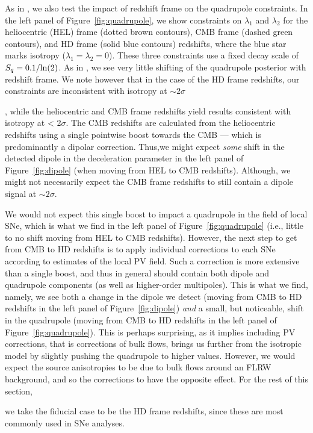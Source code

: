 \documentclass[fleqn,usenatbib]{mnras}
\newcommand{\jess}[1]{\textcolor{magenta} {\textbf{[JAC]:{#1}}}}
\begin{document}
As in , we also test the impact of redshift frame on the quadrupole constraints. %
{In the left panel of Figure~\ref{fig:quadrupole}, we show constraints on $\lambda_1$ and $\lambda_2$ for the heliocentric (HEL) frame (dotted brown contours), CMB frame (dashed green contours), and HD frame (solid blue contours) redshifts, where the blue star marks isotropy ($\lambda_1=\lambda_2=0$). These three constraints use a fixed }
decay scale of $S_q = 0.1/{\rm ln}(2)$. %
{As in} , we see {very} little shifting of the quadrupole posterior with redshift frame. We note however that {in the case of} the HD frame {redshifts, our constraints are}
inconsistent with isotropy at {$\sim 2\sigma$}{, while the heliocentric and CMB frame redshifts yield results consistent with isotropy at < 2$\sigma$. The CMB redshifts are calculated from the heliocentric redshifts using a single pointwise boost towards the CMB --- which is predominantly a dipolar correction. Thus,{we might expect \textit{some} shift in the} 
detected dipole in the deceleration parameter in the left panel of Figure~\ref{fig:dipole} (when moving from HEL to CMB redshifts).
{Although, we might not necessarily expect the CMB frame redshifts to still contain a dipole signal at $\sim 2\sigma$}. %

We would not expect this single boost to impact a quadrupole in the field of local SNe, which is what we find in the left panel of Figure~\ref{fig:quadrupole} (i.e., little to no shift moving from HEL to CMB redshifts). However, the next step to get from CMB to HD redshifts is to apply individual corrections to each SNe according to estimates of the local PV field. Such a correction is more extensive than a single boost, and thus %
in general should contain both dipole and quadrupole components {(as well as higher-order multipoles)}. 
This is what we find, namely, we see both a change in the dipole we detect (moving from CMB to HD redshifts in the left panel of Figure~\ref{fig:dipole}) \textit{and} a small, but noticeable, shift in the quadrupole (moving from CMB to HD redshifts in the left panel of Figure~\ref{fig:quadrupole}). This is perhaps surprising, as it implies including PV corrections, that is corrections of bulk flows, brings us further from the isotropic model by slightly pushing the quadrupole to higher values. However, we would expect the source  anisotropies to be due to bulk flows around an FLRW background, and so the corrections to have the opposite effect. 
For the rest of this section,} %
we take the fiducial case to be the HD frame {redshifts, since these are most commonly used in SNe analyses}.
\end{document}
